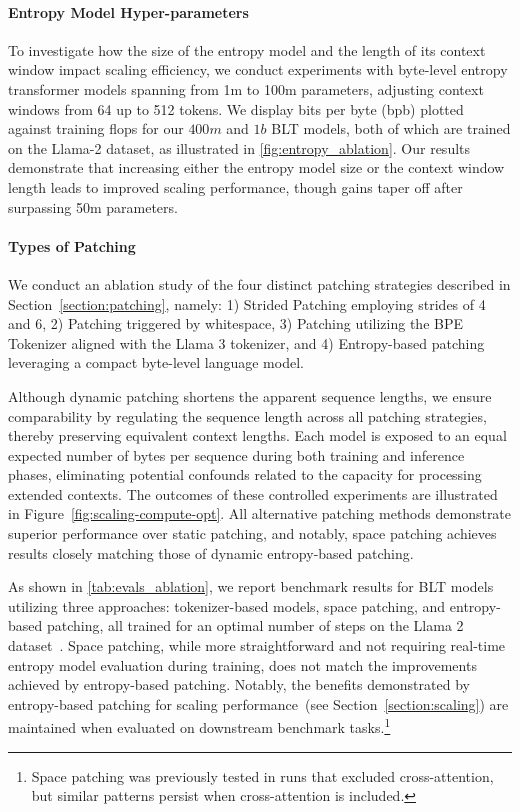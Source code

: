 \paragraph{Entropy Model Hyper-parameters} To investigate how the size of the entropy model and the length of its context window impact scaling efficiency, we conduct experiments with byte-level entropy transformer models spanning from 1m to 100m parameters, adjusting context windows from 64 up to 512 tokens. We display bits per byte (bpb) plotted against training flops for our $400m$ and $1b$ {\textsc BLT} models, both of which are trained on the Llama-2 dataset, as illustrated in \autoref{fig:entropy_ablation}. Our results demonstrate that increasing either the entropy model size or the context window length leads to improved scaling performance, though gains taper off after surpassing 50m parameters.

\paragraph{Types of Patching}

We conduct an ablation study of the four distinct patching strategies described in Section~\ref{section:patching}, namely: 1) Strided Patching employing strides of 4 and 6, 2) Patching triggered by whitespace, 3) Patching utilizing the BPE Tokenizer aligned with the Llama 3 tokenizer, and 4) Entropy-based patching leveraging a compact byte-level language model.

Although dynamic patching shortens the apparent sequence lengths, we ensure comparability by regulating the sequence length across all patching strategies, thereby preserving equivalent context lengths. Each model is exposed to an equal expected number of bytes per sequence during both training and inference phases, eliminating potential confounds related to the capacity for processing extended contexts. The outcomes of these controlled experiments are illustrated in Figure~\ref{fig:scaling-compute-opt}. All alternative patching methods demonstrate superior performance over static patching, and notably, space patching achieves results closely matching those of dynamic entropy-based patching.

As shown in \autoref{tab:evals_ablation}, we report benchmark results for {\textsc BLT} models utilizing three approaches: tokenizer-based models, space patching, and entropy-based patching, all trained for an optimal number of steps on the Llama 2 dataset~\citep{dubey2024llama}. Space patching, while more straightforward and not requiring real-time entropy model evaluation during training, does not match the improvements achieved by entropy-based patching. Notably, the benefits demonstrated by entropy-based patching for scaling performance~(see Section~\ref{section:scaling}) are maintained when evaluated on downstream benchmark tasks.\footnote{Space patching was previously tested in runs that excluded cross-attention, but similar patterns persist when cross-attention is included.}

